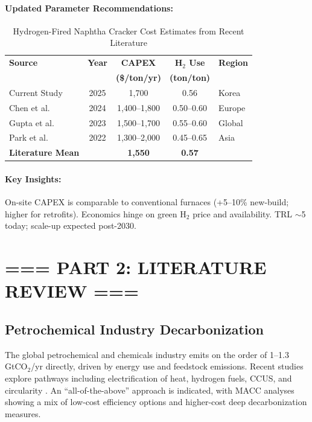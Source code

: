\documentclass[11pt]{article}
\begin{document}
\paragraph{Updated Parameter Recommendations:}
\begin{table}[htbp]
\centering
\caption{Hydrogen-Fired Naphtha Cracker Cost Estimates from Recent Literature}
\label{tab:lit_ncc_h2_costs}
\begin{tabular}{lcccl}
\toprule
\textbf{Source} & \textbf{Year} & \textbf{CAPEX} & \textbf{H$_2$ Use} & \textbf{Region} \\
 &  & \textbf{(\$/ton/yr)} & \textbf{(ton/ton)} &  \\
\midrule
Current Study & 2025 & 1{,}700 & 0.56 & Korea \\
Chen et al. \citep{Chen2024} & 2024 & 1{,}400--1{,}800 & 0.50--0.60 & Europe \\
Gupta et al. \citep{Gupta2023} & 2023 & 1{,}500--1{,}700 & 0.55--0.60 & Global \\
Park et al. \citep{Park2022} & 2022 & 1{,}300--2{,}000 & 0.45--0.65 & Asia \\
\midrule
\textbf{Literature Mean} &  & \textbf{1{,}550} & \textbf{0.57} &  \\
\bottomrule
\end{tabular}
\end{table}

\paragraph{Key Insights:}
On-site CAPEX is comparable to conventional furnaces (+5--10\% new-build; higher for retrofits). Economics hinge on green H$_2$ price and availability. TRL $\sim$5 today; scale-up expected post-2030.

\section*{=== PART 2: LITERATURE REVIEW ===}

\subsection{Petrochemical Industry Decarbonization}
The global petrochemical and chemicals industry emits on the order of \mbox{1--1.3\,GtCO$_2$/yr} directly, driven by energy use and feedstock emissions. Recent studies explore pathways including electrification of heat, hydrogen fuels, CCUS, and circularity \citep{SBTi2022,IEA2023,Kloo2024,RMI2022}. An ``all-of-the-above'' approach is indicated, with MACC analyses showing a mix of low-cost efficiency options and higher-cost deep decarbonization measures.
\end{document}
